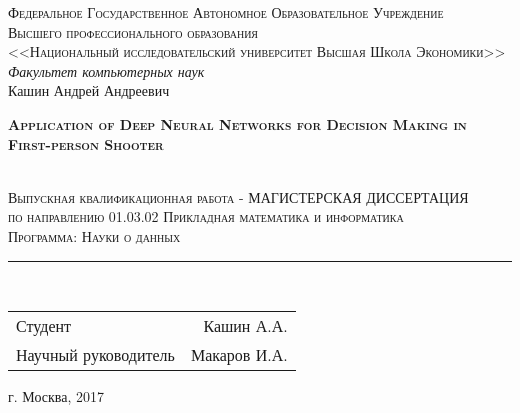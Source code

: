 
\thispagestyle{empty}

\begin{center}

  \textsc{Федеральное Государственное Автономное Образовательное Учреждение}\\[0.2cm]

  \textsc{Высшего профессионального образования \\ <<Национальный исследовательский университет Высшая Школа Экономики>>}\\[0.7cm]

  \textit{Факультет компьютерных наук}\\[0.5cm]

  Кашин Андрей Андреевич \\ [0.5cm]

  \begin{Large}
    \textsc{\textbf{Application of Deep Neural Networks for Decision Making in First-person Shooter}}
  \end{Large}\\[1cm]

  \textsc{Выпускная квалификационная работа - МАГИСТЕРСКАЯ ДИССЕРТАЦИЯ \\
  по направлению 01.03.02 Прикладная математика и информатика \\
  Программа: Науки о данных}\\[0.7cm] 

  \rule{\textwidth}{0.5pt}\\[1.5cm]

\end{center}

\begin{center}
  \begin{tabular}{lr}
    Студент &
    Кашин А.А.
    \\[0.7cm]
    Научный руководитель &
    Макаров И.А.
  \end{tabular}

  \vspace{1.5cm}

  \vfill
  г. Москва, 2017

\end{center}
